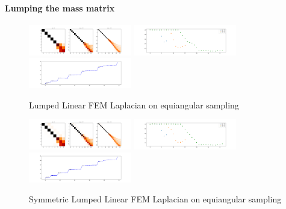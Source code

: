 \paragraph{Lumping the mass matrix}


\begin{figure}[h]
	\label{fig:FEMequiangularLumped}
	\caption{Lumped Linear FEM Laplacian on equiangular sampling}
	\centering
	\includegraphics[width=0.4\textwidth]{../codes/03.FEM_laplacian/equiangular/mass_lumping/BL/img/linearFEM.png}
	\includegraphics[width=0.4\textwidth]{../codes/03.FEM_laplacian/equiangular/mass_lumping/BL/img/linearFEM_diagonal.png}	
	\includegraphics[width=0.4\textwidth]{../codes/03.FEM_laplacian/equiangular/mass_lumping/BL/img/FEM_eigenvalues_32.png}	
\end{figure}

\begin{figure}[h]
	\label{fig:symmetricFEMequiangularLumped}
	\caption{Symmetric Lumped Linear FEM Laplacian on equiangular sampling}
	\centering
	\includegraphics[width=0.4\textwidth]{../codes/03.FEM_laplacian/equiangular/mass_lumping/BLB/img/linearFEM.png}
	\includegraphics[width=0.4\textwidth]{../codes/03.FEM_laplacian/equiangular/mass_lumping/BLB/img/linearFEM_diagonal.png}	
	\includegraphics[width=0.4\textwidth]{../codes/03.FEM_laplacian/equiangular/mass_lumping/BLB/img/FEM_eigenvalues_32.png}	
\end{figure}
